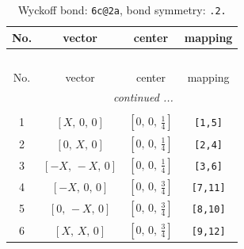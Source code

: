 \documentclass[fleqn,8pt]{jsarticle}
\begin{document}
\begin{longtable}{cccc}
\caption{Wyckoff bond: {\tt 6c@2a}, bond symmetry: {\tt .2.}}
 \\
 \hline \hline
No. & vector & center & mapping \\ \hline \endfirsthead

\multicolumn{3}{l}{\tablename\ \thetable{}} \\
 \hline \hline
No. & vector & center & mapping \\ \hline \endhead

 \hline \hline
\multicolumn{3}{r}{\footnotesize\it continued ...} \\ \endfoot

 \hline \hline
\multicolumn{3}{r}{} \\ \endlastfoot

1 & $\left[ X,\, 0,\, 0 \right]$ & $\left[ 0,\, 0,\, \frac{1}{4} \right]$ & {\tt [1,5]} \\ \hline
2 & $\left[ 0,\, X,\, 0 \right]$ & $\left[ 0,\, 0,\, \frac{1}{4} \right]$ & {\tt [2,4]} \\ \hline
3 & $\left[ - X,\, - X,\, 0 \right]$ & $\left[ 0,\, 0,\, \frac{1}{4} \right]$ & {\tt [3,6]} \\ \hline
4 & $\left[ - X,\, 0,\, 0 \right]$ & $\left[ 0,\, 0,\, \frac{3}{4} \right]$ & {\tt [7,11]} \\ \hline
5 & $\left[ 0,\, - X,\, 0 \right]$ & $\left[ 0,\, 0,\, \frac{3}{4} \right]$ & {\tt [8,10]} \\ \hline
6 & $\left[ X,\, X,\, 0 \right]$ & $\left[ 0,\, 0,\, \frac{3}{4} \right]$ & {\tt [9,12]} \\
\end{longtable}
\renewcommand{\arraystretch}{1.2}
\end{document}
